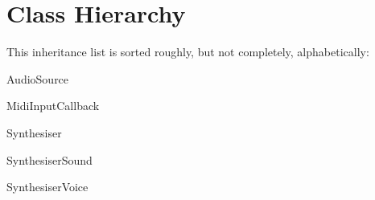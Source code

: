 \section{Class Hierarchy}
This inheritance list is sorted roughly, but not completely, alphabetically\-:\begin{DoxyCompactList}
\item Audio\-Source\begin{DoxyCompactList}
\item {}
\end{DoxyCompactList}
\item {}
\begin{DoxyCompactList}
\item {}
\end{DoxyCompactList}
\item Midi\-Input\-Callback\begin{DoxyCompactList}
\item {}
\end{DoxyCompactList}
\item Synthesiser\begin{DoxyCompactList}
\item {}
\end{DoxyCompactList}
\item Synthesiser\-Sound\begin{DoxyCompactList}
\item {}
\end{DoxyCompactList}
\item Synthesiser\-Voice\begin{DoxyCompactList}
\item {}
\end{DoxyCompactList}
\end{DoxyCompactList}
